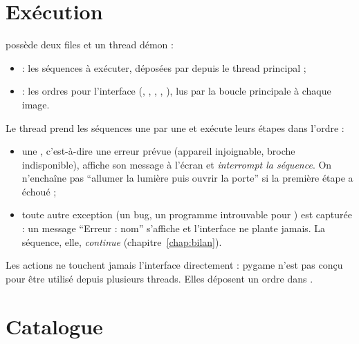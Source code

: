 \section{Exécution}

 possède deux files et un thread démon :
\begin{itemize}
  \item {} : les séquences à exécuter, déposées par  depuis le thread principal ;
  \item {} : les ordres pour l'interface (, , , , ), lus par la boucle principale à chaque image.
\end{itemize}

Le thread prend les séquences une par une et exécute leurs étapes dans l'ordre :
\begin{itemize}
  \item une , c'est-à-dire une erreur prévue (appareil injoignable, broche indisponible), affiche son message à l'écran et \emph{interrompt la séquence}. On n'enchaîne pas \enquote{allumer la lumière puis ouvrir la porte} si la première étape a échoué ;
  \item toute autre exception (un bug, un programme introuvable pour ) est capturée : un message \enquote{Erreur : nom} s'affiche et l'interface ne plante jamais. La séquence, elle, \emph{continue} (chapitre~\ref{chap:bilan}).
\end{itemize}

Les actions ne touchent jamais l'interface directement : pygame n'est pas conçu pour être utilisé depuis plusieurs threads. Elles déposent un ordre dans .

\section{Catalogue}

